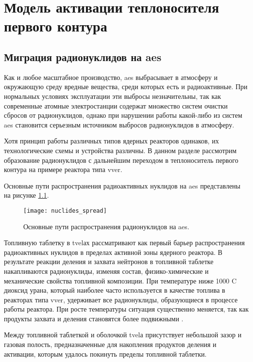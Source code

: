 \chapter{Модель активации теплоносителя первого контура}
\label{chapter_cooland_model}

\section{Миграция радионуклидов на \ac{aes}}
\label{sec_nuclides_migration}

Как и любое масштабное производство, \ac{aes} выбрасывает в атмосферу и окружающую среду вредные вещества, среди 
которых есть и радиоактивные. При нормальных условиях эксплуатации эти выбросы незначительны, так как современные 
атомные электростанции содержат множество систем очистки сбросов от радионуклидов, однако при нарушении работы 
какой-либо из систем \ac{aes} становится серьезным источником выбросов радионуклидов в атмосферу. 

Хотя принцип работы различных типов ядерных реакторов одинаков, их технологические схемы и устройства различны. В 
данном разделе рассмотрим образование радионуклидов с дальнейшим переходом в теплоноситель первого контура на примере 
реактора типа \ac{vver}.

Основные пути распространения радиоактивных нуклидов на \ac{aes} представлены на рисунке \ref{fig_nuclides_spread}.

\begin{figure}[ht]
\centering
	\texttt{[image: nuclides\_spread]}
	\captionsetup{justification=centering}
    \caption{Основные пути распространения радионуклидов на \ac{aes}.}
    \label{fig_nuclides_spread}
\end{figure}

Топливную таблетку в \ac{tvel}ах рассматривают как первый барьер распространения радиоактивных нуклидов в пределах 
активной зоны ядерного реактора. В результате реакции деления и захвата нейтронов в топливной таблетке накапливаются 
радионуклиды, изменяя состав, физико-химические и механические свойства топливной композиции. При температуре ниже 
1000 \degree C диоксид урана, который наиболее часто используется в качестве топлива в реакторах типа \ac{vver}, 
удерживает все радионуклиды, образующиеся в процессе работы реактора. При росте температуры ситуация существенно 
меняется, так как продукты захвата и деления становятся более подвижными \cite{leskin_vver}.

Между топливной таблеткой и оболочкой \ac{tvel}а присутствует небольшой зазор и газовая полость, предназначенные для 
накопления продуктов деления и активации, которым удалось покинуть пределы топливной таблетки.

